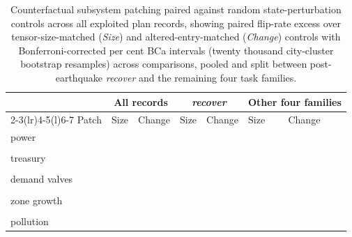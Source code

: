 \begin{table}[tbp]
\caption{Counterfactual subsystem patching paired against random state-perturbation controls across all \PtRecords{} exploited plan records, showing paired flip-rate excess over tensor-size-matched (\emph{Size}) and altered-entry-matched (\emph{Change}) controls with Bonferroni-corrected \PcCorrLevel{} per cent BCa intervals (twenty thousand city-cluster bootstrap resamples) across \PcComparisons{} comparisons, pooled and split between post-earthquake \emph{recover} and the remaining four task families.}
\label{tab:patch}
\centering\scriptsize\setlength{\tabcolsep}{4pt}
\begin{tabular}{@{}lllllll@{}}
\toprule
 & \multicolumn{2}{c}{All records} & \multicolumn{2}{c}{\emph{recover}} & \multicolumn{2}{c}{Other four families} \\
\cmidrule(lr){2-3}\cmidrule(lr){4-5}\cmidrule(l){6-7}
Patch & Size & Change & Size & Change & Size & Change \\
\midrule
power & \PcPowerSizeAll{} & \PcPowerChgAll{} & \PcPowerSizeRecov{} & \PcPowerChgRecov{} & \PcPowerSizeOther{} & \PcPowerChgOther{} \\
 & \PcPowerSizeAllCI{} & \PcPowerChgAllCI{} & \PcPowerSizeRecovCI{} & \PcPowerChgRecovCI{} & \PcPowerSizeOtherCI{} & \PcPowerChgOtherCI{} \\[1pt]
treasury & \PcTreasurySizeAll{} & \PcTreasuryChgAll{} & \PcTreasurySizeRecov{} & \PcTreasuryChgRecov{} & \PcTreasurySizeOther{} & \PcTreasuryChgOther{} \\
 & \PcTreasurySizeAllCI{} & \PcTreasuryChgAllCI{} & \PcTreasurySizeRecovCI{} & \PcTreasuryChgRecovCI{} & \PcTreasurySizeOtherCI{} & \PcTreasuryChgOtherCI{} \\[1pt]
demand valves & \PcValvesSizeAll{} & \PcValvesChgAll{} & \PcValvesSizeRecov{} & \PcValvesChgRecov{} & \PcValvesSizeOther{} & \PcValvesChgOther{} \\
 & \PcValvesSizeAllCI{} & \PcValvesChgAllCI{} & \PcValvesSizeRecovCI{} & \PcValvesChgRecovCI{} & \PcValvesSizeOtherCI{} & \PcValvesChgOtherCI{} \\[1pt]
zone growth & \PcZoneGrowthSizeAll{} & \PcZoneGrowthChgAll{} & \PcZoneGrowthSizeRecov{} & \PcZoneGrowthChgRecov{} & \PcZoneGrowthSizeOther{} & \PcZoneGrowthChgOther{} \\
 & \PcZoneGrowthSizeAllCI{} & \PcZoneGrowthChgAllCI{} & \PcZoneGrowthSizeRecovCI{} & \PcZoneGrowthChgRecovCI{} & \PcZoneGrowthSizeOtherCI{} & \PcZoneGrowthChgOtherCI{} \\[1pt]
pollution & \PcPollutionSizeAll{} & \PcPollutionChgAll{} & \PcPollutionSizeRecov{} & \PcPollutionChgRecov{} & \PcPollutionSizeOther{} & \PcPollutionChgOther{} \\

\end{tabular}
\end{table}

